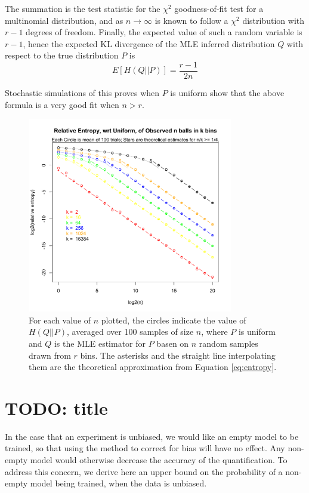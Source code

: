 \documentclass[letterpaper]{article}
\begin{document}
The summation is the test statistic for the $\chi^2$ goodness-of-fit test for a
multinomial distribution, and as $n \rightarrow \infty$ is known to follow a
$\chi^2$ distribution with $r - 1$ degrees of freedom. Finally, the expected
value of such a random variable is $r - 1$, hence the expected KL divergence of
the MLE inferred distribution $Q$ with respect to the true distribution $P$ is
\begin{equation}
\label{eq:entropy}
E[H(Q||P)] = \frac{r - 1}{2n}
\end{equation}

Stochastic simulations of this proves when $P$ is uniform show that the above
formula is a very good fit when $n > r$.

\begin{figure}[H]
\centerline{\includegraphics[width=0.8\textwidth]{fig/entropy.pdf}}
\caption{For each value of $n$ plotted, the circles indicate the value of
$H(Q||P)$, averaged over 100 samples of size $n$, where $P$ is uniform and $Q$
is the MLE estimator for $P$ basen on $n$ random samples drawn from $r$ bins.
The asterisks and the straight line interpolating them are the theoretical
approximation from Equation \ref{eq:entropy}.
}
\label{fig:entropy}
\end{figure}

\section{TODO: title}

In the case that an experiment is unbiased, we would like an empty model to be
trained, so that using the method to correct for bias will have no effect. Any
non-empty model would otherwise decrease the accuracy of the quantification. To
address this concern, we derive here an upper bound on the probability of a
non-empty model being trained, when the data is unbiased.
\end{document}
